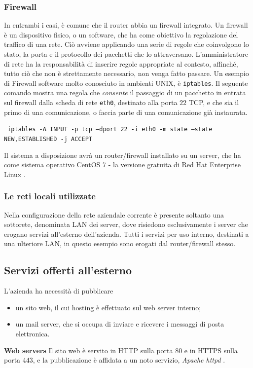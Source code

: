 \subsubsection{Firewall}
In entrambi i casi, è comune che il router abbia un firewall \cite{RFC2979} integrato.
Un firewall è un dispositivo fisico, o un software, che ha come obiettivo la regolazione del traffico di una rete.
Ciò avviene applicando una serie di regole che coinvolgono lo stato, la porta e il protocollo dei pacchetti che lo attraversano.
L'amministratore di rete ha la responsabilità di inserire regole appropriate al contesto, affinché, tutto ciò che non è strettamente necessario, non venga fatto passare.
Un esempio di Firewall software molto conosciuto in ambienti UNIX, è \texttt{iptables}.
Il seguente comando mostra una regola che \emph{consente} il passaggio di un pacchetto in entrata sul firewall dalla scheda di rete \texttt{eth0}, destinato alla porta $22$ TCP, e che sia il primo di una comunicazione, o faccia parte di una comunicazione già instaurata.

\newpage
\texttt{
    iptables -A INPUT  -p tcp --dport 22 -i eth0 \linebreak
    -m state --state NEW,ESTABLISHED -j ACCEPT
}

Il sistema a disposizione avrà un router/firewall installato su un server, che ha come sistema operativo CentOS 7 \cite{CENTOS} - la versione gratuita di Red Hat Enterprise Linux \cite{RHEL}.

\subsubsection{Le reti locali utilizzate}
Nella configurazione della rete aziendale corrente è presente soltanto una sottorete, denominata LAN dei server, dove risiedono esclusivamente i server che erogano servizi all'esterno dell'azienda. Tutti i servizi per uso interno, destinati a una ulteriore LAN, in questo esempio sono erogati dal router/firewall stesso.

\subsection{Servizi offerti all'esterno}
L'azienda ha necessità di pubblicare
\begin{itemize}
    \item un sito web, il cui hosting è effettuato sul web server interno;
    \item un mail server, che si occupa di inviare e ricevere i messaggi di posta elettronica.
\end{itemize}
\noindent \textbf{Web servers}
Il sito web è servito in HTTP sulla porta $80$ e in HTTPS sulla porta $443$, e la pubblicazione è affidata a un noto servizio, \emph{Apache httpd} \cite{APACHE}.

